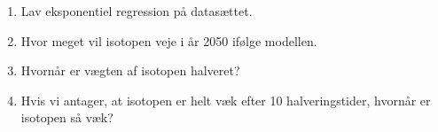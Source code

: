 \begin{enumerate}[label=\roman*)]
	\item Lav eksponentiel regression på datasættet.
	\item Hvor meget vil isotopen veje i år 2050 ifølge modellen.
	\item Hvornår er vægten af isotopen halveret?
	\item Hvis vi antager, at isotopen er helt væk efter 10 halveringstider, hvornår er isotopen så væk?
\end{enumerate}
